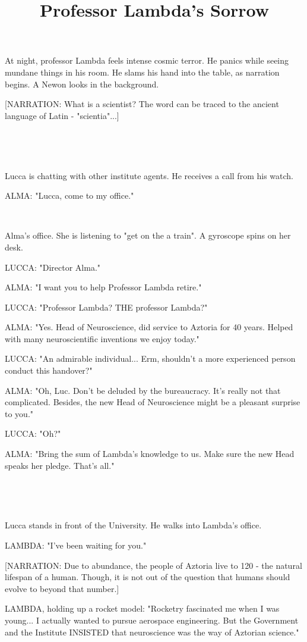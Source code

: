 \documentclass[11pt]{article}
\begin{document}
\ttfamily
\title{Professor Lambda's Sorrow}
\maketitle

At night, professor Lambda feels intense cosmic terror. He panics while seeing mundane things in his room. He slams his hand into the table, as narration begins.
A Newon looks in the background.

[NARRATION: What is a scientist?
The word can be traced to the ancient language of Latin - "scientia"...]

\ 

\ 

Lucca is chatting with other institute agents.
He receives a call from his watch.

ALMA: "Lucca, come to my office."

\ 

Alma's office.
She is listening to "get on the a train".
A gyroscope spins on her desk.

LUCCA: "Director Alma."

ALMA: "I want you to help Professor Lambda retire."

LUCCA: "Professor Lambda? THE professor Lambda?"

ALMA: "Yes. Head of Neuroscience, did service to Aztoria for 40 years.
Helped with many neuroscientific inventions we enjoy today."

LUCCA: "An admirable individual...
Erm, shouldn't a more experienced person conduct this handover?"

ALMA: "Oh, Luc. 
Don't be deluded by the bureaucracy.
It's really not that complicated.
Besides, the new Head of Neuroscience might be a pleasant surprise to you."

LUCCA: "Oh?"

ALMA: "Bring the sum of Lambda's knowledge to us.
Make sure the new Head speaks her pledge.
That's all."

\ 

\ 

Lucca stands in front of the University.
He walks into Lambda's office.

LAMBDA: "I've been waiting for you."

[NARRATION: Due to abundance, the people of Aztoria live to 120 - the natural lifespan of a human.
Though, it is not out of the question that humans should evolve to beyond that number.]

LAMBDA, holding up a rocket model: "Rocketry fascinated me when I was young...
I actually wanted to pursue aerospace engineering.
But the Government and the Institute INSISTED that neuroscience was the way of Aztorian science."
\end{document}
